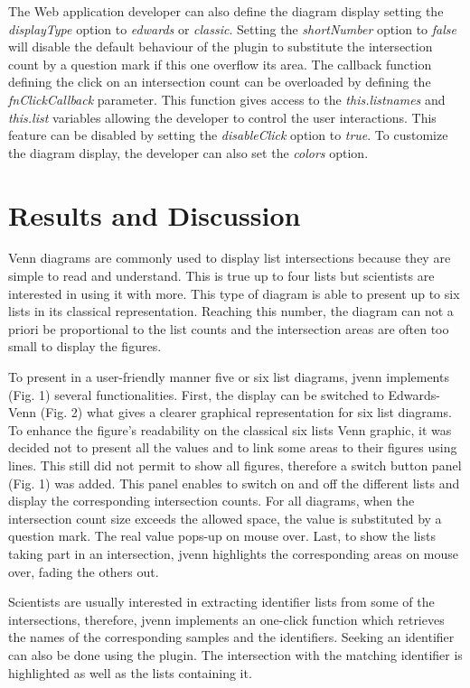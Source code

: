 \documentclass{bmcart}
\begin{document}
The Web application developer can also define the diagram display setting the
\textit{displayType} option to \textit{edwards} or \textit{classic}. Setting the
\textit{shortNumber} option to \textit{false} will disable the default behaviour
of the plugin to substitute the intersection count by a question mark if this
one overflow its area. The callback function defining the click on an
intersection count can be overloaded by defining the \textit{fnClickCallback} parameter. 
This function gives access to the \textit{this.listnames} and \textit{this.list}
variables allowing the developer to control the user interactions. This feature can be disabled by 
setting the \textit{disableClick} option to \textit{true}. To customize the
diagram display, the developer can also set the \textit{colors} option.


\section*{Results and Discussion}

Venn diagrams are commonly used to display list intersections because they are
simple to read and understand. This is true up to four lists but scientists are
interested in using it with more. This type of diagram is able to present up
to six lists in its classical representation. Reaching this number, the
diagram can not a priori be proportional to the list counts and the intersection
areas are often too small to display the figures. 

To present in a user-friendly manner five or six list diagrams, jvenn implements
(Fig. 1) several functionalities. First, the display can be switched to Edwards-Venn
(Fig. 2) what gives a clearer graphical representation for six list diagrams. To
enhance the figure's readability on the classical six lists Venn graphic, it was decided not
to present all the values and to link some areas to their figures using lines.
This still did not permit to show all figures, therefore a switch button panel
(Fig. 1) was added. This panel enables to switch on and off the different lists
and display the corresponding intersection counts. For all diagrams, when
the intersection count size exceeds the allowed space, the value is substituted
by a question mark. The real value pops-up on mouse over. Last, to show the
lists taking part in an intersection, jvenn highlights the corresponding areas on mouse over, 
fading the others out.

Scientists are usually interested in extracting identifier lists from some of
the intersections, therefore, jvenn implements an one-click function which
retrieves the names of the corresponding samples and the identifiers. Seeking
an identifier can also be done using the plugin. The intersection with the
matching identifier is highlighted as well as the lists containing it.
\end{document}
